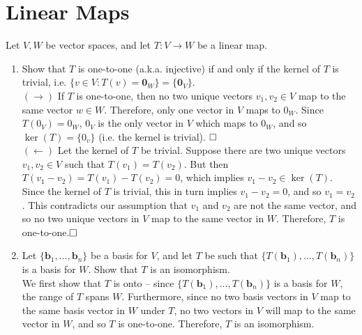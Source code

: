 \documentclass{article}
\begin{document}
\section{Linear Maps} 
Let $V,W$ be vector spaces, and let $T: V \to W$ be a linear map. 
\begin{enumerate}[label=\arabic*.]
	\item Show that $T$ is one-to-one (a.k.a. injective) if and only if the kernel of $T$ is trivial, i.e. $\{v \in V: T(v) = \textbf{0}_W\} = \{\textbf{0}_V\}$. \\
	{\color{blue} $(\rightarrow)$ If $T$ is one-to-one, then no two unique vectors $v_1, v_2 \in V$ map to the same vector $w \in W$. Therefore, only one vector in $V$ maps to $0_W$. Since $T(0_V) = 0_W$, $0_V$ is the only vector in $V$ which maps to $0_W$, and so $\ker(T) = \{0_v\}$ (i.e. the kernel is trivial). $\hfill\square$\\
	$(\leftarrow)$ Let the kernel of $T$ be trivial. Suppose there are two unique vectors $v_1, v_2 \in V$ such that $T(v_1) = T(v_2)$. But then $T(v_1 - v_2) = T(v_1) - T(v_2) = 0$, which implies $v_1 - v_2 \in \ker(T)$. Since the kernel of $T$ is trivial, this in turn implies $v_1 - v_2 = 0$, and so $v_1 = v_2$. This contradicts our assumption that $v_1$ and $v_2$ are not the same vector, and so no two unique vectors in $V$ map to the same vector in $W$. Therefore, $T$ is one-to-one.$\hfill\square$} 
	\item Let $\{\textbf{b}_1, ... , \textbf{b}_n\}$ be a basis for $V$, and let $T$ be such that $\{T(\textbf{b}_1), ... , T(\textbf{b}_n)\}$ is a basis for $W$. Show that $T$ is an isomorphism. \\
	{\color{blue} We first show that $T$ is onto -- since $\{T(\textbf{b}_1), \ldots, T(\textbf{b}_n)\}$ is a basis for $W$, the range of $T$ spans $W$. Furthermore, since no two basis vectors in $V$ map to the same basis vector in $W$ under $T$, no two vectors in $V$ will map to the same vector in $W$, and so $T$ is one-to-one. Therefore, $T$ is an isomorphism.}
\end{enumerate}
\end{document}
